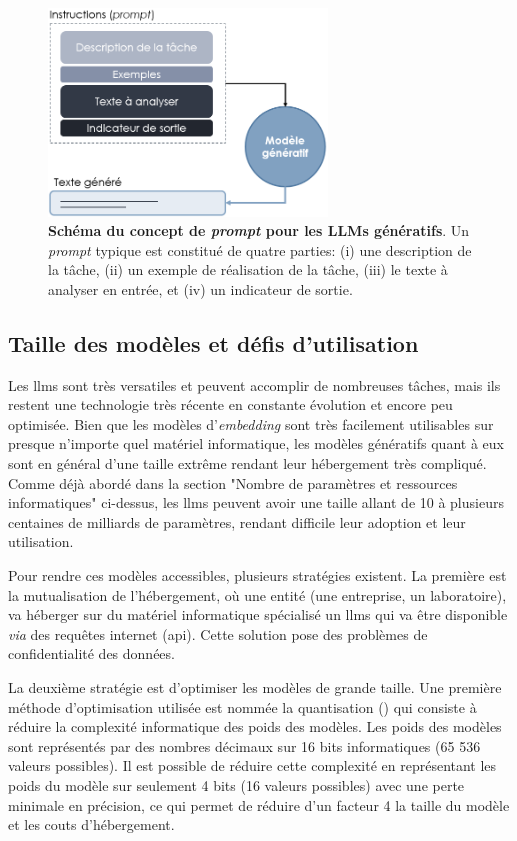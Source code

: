 \begin{figure}[!ht]
 \centering
 \includegraphics[width=0.66\textwidth]{figures/promt_llm.png}
 \caption[Schéma du concept de \textit{prompt} pour les LLMs génératifs]{\textbf{Schéma du concept de \textit{prompt} pour les LLMs génératifs}. Un \textit{prompt} typique est constitué de quatre parties: (i) une description de la tâche, (ii) un exemple de réalisation de la tâche, (iii) le texte à analyser en entrée, et (iv) un indicateur de sortie.}
 \label{fig:llm-prompt}
\end{figure}

\subsection{Taille des modèles et défis d'utilisation}
Les \gls{llms} sont très versatiles et peuvent accomplir de nombreuses tâches, mais ils restent une technologie très récente en constante évolution et encore peu optimisée. Bien que les modèles d'\textit{embedding} sont très facilement utilisables sur presque n'importe quel matériel informatique, les modèles génératifs quant à eux sont en général d'une taille extrême rendant leur hébergement très compliqué. Comme déjà abordé dans la section "Nombre de paramètres et ressources informatiques" ci-dessus, les \gls{llms} peuvent avoir une taille allant de 10 à plusieurs centaines de milliards de paramètres, rendant difficile leur adoption et leur utilisation.


Pour rendre ces modèles accessibles, plusieurs stratégies existent. La première est la mutualisation de l'hébergement, où une entité (une entreprise, un laboratoire), va héberger sur du matériel informatique spécialisé un \gls{llms} qui va être disponible \textit{via} des requêtes internet (\gls{api}). Cette solution pose des problèmes de confidentialité des données. 

La deuxième stratégie est d'optimiser les modèles de grande taille. Une première méthode d'optimisation utilisée est nommée la quantisation (\cite{dettmers_case_2023, dettmers_llmint8_2022}) qui consiste à réduire la complexité informatique des poids des modèles. Les poids des modèles sont représentés par des nombres décimaux sur 16 bits informatiques (65 536 valeurs possibles). Il est possible de réduire cette complexité en représentant les poids du modèle sur seulement 4 bits (16 valeurs possibles) avec une perte minimale en précision, ce qui permet de réduire d'un facteur 4 la taille du modèle et les couts d'hébergement.


